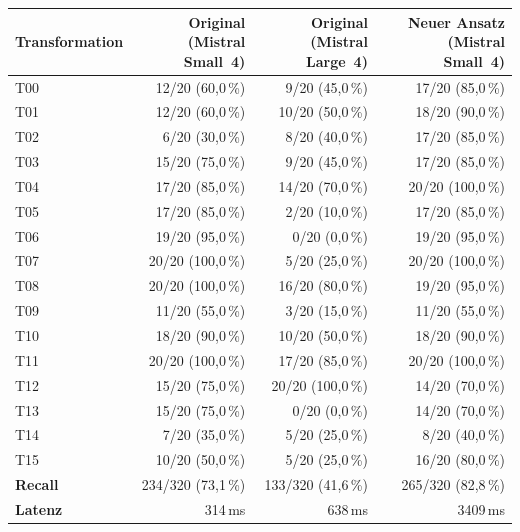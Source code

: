 \begin{tabular}{l r r r}
\toprule
\textbf{Transformation} & Original (Mistral Small~4) & Original (Mistral Large~4) & \textbf{Neuer Ansatz (Mistral Small~4)} \\
\midrule
T00 & 12/20 (60{,}0\,\%) & 9/20 (45{,}0\,\%) & 17/20 (85{,}0\,\%) \\
T01 & 12/20 (60{,}0\,\%) & 10/20 (50{,}0\,\%) & 18/20 (90{,}0\,\%) \\
T02 & 6/20 (30{,}0\,\%) & 8/20 (40{,}0\,\%) & 17/20 (85{,}0\,\%) \\
T03 & 15/20 (75{,}0\,\%) & 9/20 (45{,}0\,\%) & 17/20 (85{,}0\,\%) \\
T04 & 17/20 (85{,}0\,\%) & 14/20 (70{,}0\,\%) & 20/20 (100{,}0\,\%) \\
T05 & 17/20 (85{,}0\,\%) & 2/20 (10{,}0\,\%) & 17/20 (85{,}0\,\%) \\
T06 & 19/20 (95{,}0\,\%) & 0/20 (0{,}0\,\%) & 19/20 (95{,}0\,\%) \\
T07 & 20/20 (100{,}0\,\%) & 5/20 (25{,}0\,\%) & 20/20 (100{,}0\,\%) \\
T08 & 20/20 (100{,}0\,\%) & 16/20 (80{,}0\,\%) & 19/20 (95{,}0\,\%) \\
T09 & 11/20 (55{,}0\,\%) & 3/20 (15{,}0\,\%) & 11/20 (55{,}0\,\%) \\
T10 & 18/20 (90{,}0\,\%) & 10/20 (50{,}0\,\%) & 18/20 (90{,}0\,\%) \\
T11 & 20/20 (100{,}0\,\%) & 17/20 (85{,}0\,\%) & 20/20 (100{,}0\,\%) \\
T12 & 15/20 (75{,}0\,\%) & 20/20 (100{,}0\,\%) & 14/20 (70{,}0\,\%) \\
T13 & 15/20 (75{,}0\,\%) & 0/20 (0{,}0\,\%) & 14/20 (70{,}0\,\%) \\
T14 & 7/20 (35{,}0\,\%) & 5/20 (25{,}0\,\%) & 8/20 (40{,}0\,\%) \\
T15 & 10/20 (50{,}0\,\%) & 5/20 (25{,}0\,\%) & 16/20 (80{,}0\,\%) \\
\midrule
\textbf{Recall} & 234/320 (73{,}1\,\%) & 133/320 (41{,}6\,\%) & 265/320 (82{,}8\,\%) \\
\textbf{Latenz} & 314\,ms & 638\,ms & 3409\,ms \\
\bottomrule
\end{tabular}
